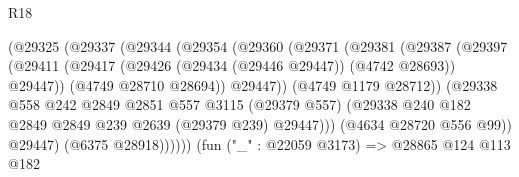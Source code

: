 \begin{lexlean}{R18}
\begin{coremodule}
                                        (@29325
                                          (@29337
                                            (@29344
                                              (@29354
                                                (@29360
                                                  (@29371
                                                    (@29381
                                                      (@29387
                                                        (@29397
                                                          (@29411
                                                            (@29417
                                                              (@29426
                                                                (@29434 (@29446 @29447))
                                                                (@4742 @28693))
                                                              @29447))
                                                          (@4749 @28710 @28694))
                                                        @29447))
                                                    (@4749 @1179 @28712))
                                                  (@29338
                                                    @558
                                                    @242
                                                    @2849
                                                    @2851
                                                    @557
                                                    @3115
                                                    (@29379 @557)
                                                    (@29338
                                                      @240
                                                      @182
                                                      @2849
                                                      @2849
                                                      @239
                                                      @2639
                                                      (@29379 @239)
                                                      @29447)))
                                                (@4634 @28720 @556 @99))
                                              @29447)
                                            (@6375 @28918))))))
                                  (fun ("_" : @22059 @3173) =>
                                  @28865
                                    @124
                                    @113
                                    @182

\end{coremodule}
\end{lexlean}

